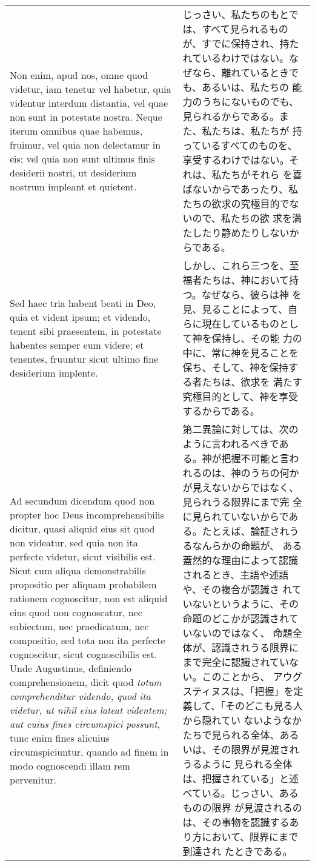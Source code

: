 \documentclass[10pt]{jsarticle} %
\begin{document}
\begin{longtable}{p{21em}p{21em}}
Non enim, apud nos, omne quod videtur, iam tenetur vel habetur, quia
videntur interdum distantia, vel quae non sunt in potestate
nostra. Neque iterum omnibus quae habemus, fruimur, vel quia non
delectamur in eis; vel quia non sunt ultimus finis desiderii nostri,
ut desiderium nostrum impleant et quietent.

&

じっさい、私たちのもとでは、すべて見られるものが、すでに保持され、持た
れているわけではない。なぜなら、離れているときでも、あるいは、私たちの
能力のうちにないものでも、見られるからである。また、私たちは、私たちが
持っているすべてのものを、享受するわけではない。それは、私たちがそれら
を喜ばないからであったり、私たちの欲求の究極目的でないので、私たちの欲
求を満たしたり静めたりしないからである。

\\

Sed haec tria habent beati in Deo, quia et vident ipsum; et videndo,
tenent sibi praesentem, in potestate habentes semper eum videre; et
tenentes, fruuntur sicut ultimo fine desiderium implente.

&

しかし、これら三つを、至福者たちは、神において持つ。なぜなら、彼らは神
を見、見ることによって、自らに現在しているものとして神を保持し、その能
力の中に、常に神を見ることを保ち、そして、神を保持する者たちは、欲求を
満たす究極目的として、神を享受するからである。

\\

{\sc Ad secundum dicendum} quod non propter hoc Deus
incomprehensibilis dicitur, quasi aliquid eius sit quod non videatur,
sed quia non ita perfecte videtur, sicut visibilis est. Sicut cum
aliqua demonstrabilis propositio per aliquam probabilem rationem
cognoscitur, non est aliquid eius quod non cognoscatur, nec subiectum,
nec praedicatum, nec compositio, sed tota non ita perfecte
cognoscitur, sicut cognoscibilis est. Unde Augustinus, definiendo
comprehensionem, dicit quod {\it totum comprehenditur videndo, quod
ita videtur, ut nihil eius lateat videntem; aut cuius fines
circumspici possunt}, tunc enim fines alicuius circumspiciuntur,
quando ad finem in modo cognoscendi illam rem pervenitur.

&

第二異論に対しては、次のように言われるべきである。神が把握不可能と言わ
れるのは、神のうちの何かが見えないからではなく、見られうる限界にまで完
全に見られていないからである。たとえば、論証されうるなんらかの命題が、
ある蓋然的な理由によって認識されるとき、主語や述語や、その複合が認識さ
れていないというように、その命題のどこかが認識されていないのではなく、
命題全体が、認識されうる限界にまで完全に認識されていない。このことから、
アウグスティヌスは、「把握」を定義して、「そのどこも見る人から隠れてい
ないようなかたちで見られる全体、あるいは、その限界が見渡されうるように
見られる全体は、把握されている」と述べている。じっさい、あるものの限界
が見渡されるのは、その事物を認識するあり方において、限界にまで到達され
たときである。


\end{longtable}
\end{document}
